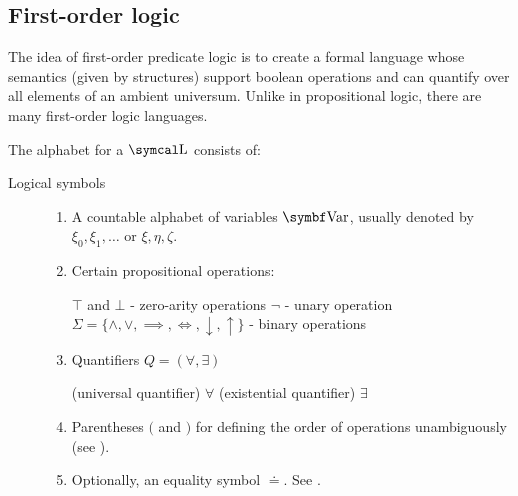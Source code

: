 \subsection{First-order logic}\label{subsec:first_order_logic}

\begin{definition}\label{def:first_order_logic_language}\cite[187]{OpenLogic20201202}
  The idea of first-order predicate logic is to create a formal language whose semantics (given by structures) support boolean operations and can quantify over all elements of an ambient universum. Unlike in propositional logic, there are many first-order logic languages.

  The alphabet for a  \( \CL \) consists of:
  \begin{description}
    \item[Logical symbols]
    \mbox{}
    \begin{enumerate}
      \item A countable alphabet of variables \( \Bold{Var} \), usually denoted by \( \xi_0, \xi_1, \ldots \) or \( \xi, \eta, \zeta \).

      \item Certain propositional operations:
      \begin{description}
         \( \top \) and \( \bot \) - zero-arity operations
         \( \neg \) - unary operation
         \( \Sigma = \{ \land, \lor, \implies, \iff, \downarrow, \uparrow \} \) - binary operations
      \end{description}

      \item Quantifiers \( Q = ( \forall, \exists ) \)
      \begin{description}
        (universal quantifier) \( \forall \)
        (existential quantifier) \( \exists \)
      \end{description}

      \item Parentheses \( ( \) and \( ) \) for defining the order of operations unambiguously (see ).

      \item Optionally, an equality symbol \( \doteq \). See .
    \end{enumerate}


\end{description}
\end{definition}
